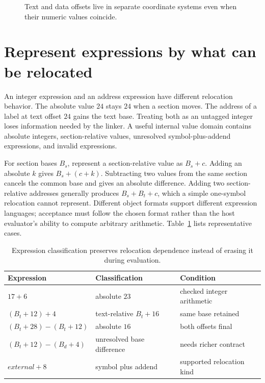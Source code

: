 \begin{figure}[htbp]
\centering
{}
\caption{Text and data offsets live in separate coordinate systems even when their numeric values coincide.}
\label{fig:ch53-counters}
\end{figure}

\section{Represent expressions by what can be relocated}
\label{sec:ch53-expressions}

An integer expression and an address expression have different relocation behavior.
The absolute value $24$ stays $24$ when a section moves.
The address of a label at text offset $24$ gains the text base.
Treating both as an untagged integer loses information needed by the linker.
A useful internal value domain contains absolute integers, section-relative values, unresolved symbol-plus-addend expressions, and invalid expressions.

For section bases $B_s$, represent a section-relative value as $B_s+c$.
Adding an absolute $k$ gives $B_s+(c+k)$.
Subtracting two values from the same section cancels the common base and gives an absolute difference.
Adding two section-relative addresses generally produces $B_s+B_t+c$, which a simple one-symbol relocation cannot represent.
Different object formats support different expression languages; acceptance must follow the chosen format rather than the host evaluator's ability to compute arbitrary arithmetic.
Table~\ref{tab:ch53-expressions} lists representative cases.

\begin{table}[htbp]
\caption{Expression classification preserves relocation dependence instead of erasing it during evaluation.}
\label{tab:ch53-expressions}
\centering
\begin{tabular}{lll}
\toprule
Expression & Classification & Condition \\
\midrule
$17+6$ & absolute $23$ & checked integer arithmetic \\
$(B_t+12)+4$ & text-relative $B_t+16$ & same base retained \\
$(B_t+28)-(B_t+12)$ & absolute $16$ & both offsets final \\
$(B_t+12)-(B_d+4)$ & unresolved base difference & needs richer contract \\
$external+8$ & symbol plus addend & supported relocation kind \\
\bottomrule
\end{tabular}
\end{table}

